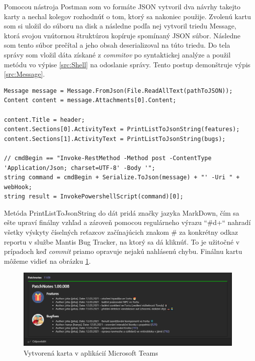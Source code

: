 \documentclass[slovak, bachelorpractice]{diploma}
\begin{document}
Pomocou nástroja Postman som vo formáte JSON vytvoril dva návrhy takejto karty a nechal kolegov rozhodnúť o tom, ktorý sa nakoniec použije. Zvolenú kartu som si uložil do súboru na disk a následne podľa nej vytvoril triedu Message, ktorá svojou vnútornou štruktúrou kopíruje spomínaný JSON súbor. Následne som tento súbor prečítal a jeho obsah deserializoval na túto triedu. Do tela správy som vložil dáta získané z \textit{commitov} po syntaktickej analýze a použil metódu vo výpise \ref{src:Shell} na odoslanie správy. Tento postup demonštruje výpis \ref{src:Message}. 
\vspace{10pt}
\begin{lstlisting}[label=src:Message,caption={Vytvorenie a odoslanie správy do služby Microsoft Teams}]
Message message = Message.FromJson(File.ReadAllText(pathToJSON));
Content content = message.Attachments[0].Content;

content.Title = header;
content.Sections[0].ActivityText = PrintListToJsonString(features);
content.Sections[1].ActivityText = PrintListToJsonString(bugs);

// cmdBegin == "Invoke-RestMethod -Method post -ContentType 'Application/Json; charset=UTF-8' -Body '";
string command = cmdBegin + Serialize.ToJson(message) + "' -Uri " + webHook;
string result = InvokePowershellScript(command)[0];
\end{lstlisting}

Metóda PrintListToJsonString do dát pridá značky jazyka MarkDown, čím sa ešte upraví finálny vzhľad a zároveň pomocou regulárneho výrazu \mbox{``\#\\d+``} nahradí všetky výskyty číselných reťazcov začínajúcich znakom \# za konkrétny odkaz reportu v službe Mantis Bug Tracker, na ktorý sa dá kliknúť. To je užitočné v prípadoch keď \textit{commit} priamo opravuje nejakú nahlásenú chybu. Finálnu kartu môžeme vidieť na obrázku \ref{pic:Logger}.

\begin{figure}[!htbp]
	\centering
	\includegraphics[width=1\textwidth]{Pictures/gitlogger.png}
	\caption{Vytvorená karta v aplikácií Microsoft Teams}
	\label{pic:Logger}
\end{figure}
\end{document}
